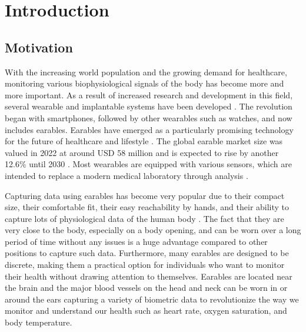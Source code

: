 \chapter{Introduction}
\label{ch:Introduction}

\section{Motivation}
\label{ch:Introduction:Motivation}
With the increasing world population and the growing demand for healthcare, monitoring various biophysiological signals of the body has become more and more important. 
As a result of increased research and development in this field, several wearable and implantable systems have been developed \cite{loncar-turukaloLiteratureWearableTechnology2019}.
The revolution began with smartphones, followed by other wearables such as watches, and now includes earables.
Earables have emerged as a particularly promising technology for the future of healthcare and lifestyle \cite{trespGoingDigitalSurvey2016, kirkWearablesRevolutionStandardization2014a}. 
The global earable market size was valued in 2022 at around USD 58 million and is expected to rise by another 12.6\% until 2030 \cite{GlobalEarphonesHeadphones2018}.
Most wearables are equipped with various sensors, which are intended to replace a modern medical laboratory through analysis \cite{loncar-turukaloLiteratureWearableTechnology2019}.

Capturing data using earables has become very popular due to their compact size, their comfortable fit, their easy reachability by hands, and their ability to capture lots of physiological data of the human body \cite{roddigerSensingEarablesSystematic2022a}. 
The fact that they are very close to the body, especially on a body opening, and can be worn over a long period of time without any issues is a huge advantage compared to other positions to capture such data.
Furthermore, many earables are designed to be discrete, making them a practical option for individuals who want to monitor their health without drawing attention to themselves.
Earables are located near the brain and the major blood vessels on the head and neck can be worn in or around the ears capturing a variety of biometric data to revolutionize the way we monitor and understand our health such as heart rate, oxygen saturation, and body temperature.

